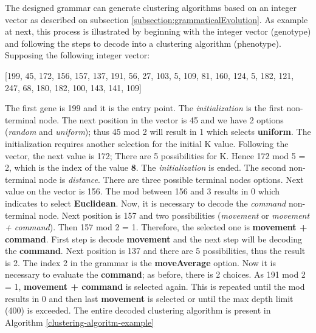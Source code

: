 \documentclass[journal]{IEEEtran}
\begin{document}
	The designed grammar can generate clustering algorithms based on an integer vector as described on subsection \ref{subsection:grammaticalEvolution}. As example at next, this process is illustrated by beginning with the integer vector (genotype) and following the steps to decode into a clustering algorithm (phenotype). 
	Supposing the following integer vector:
	
	[199, 45, 172, 156, 157, 137, 191, 56, 27, 103, 5, 109, 81, 160, 124, 5, 182, 121, 247, 68, 180, 182, 100, 143, 141, 109]
	
	The first gene is 199 and it is the entry point. The \textit{initialization} is the first non-terminal node. The next position in the vector is 45 and we have 2 options (\textit{random} and \textit{uniform}); thus 45 mod 2 will result in 1 which selects \textbf{uniform}. The initialization requires another selection for the initial K value. Following the vector, the next value is 172; There are 5 possibilities for K. Hence 172 mod 5 = 2, which is the index of the value \textbf{8}. The \textit{initialization} is ended. The second non-terminal node is \textit{distance}. There are three possible terminal nodes options. Next value on the vector is 156. The mod between 156 and 3 results in 0 which indicates to select \textbf{Euclidean}. Now, it is necessary to decode the \textit{command} non-terminal node. Next position is 157 and two possibilities (\textit{movement} or \textit{movement + command}). Then 157 mod 2 = 1. Therefore, the selected one is \textbf{movement + command}. First step is decode \textbf{movement} and the next step will be decoding the \textbf{command}. Next position is 137 and there are 5 possibilities, thus the result is 2. The index 2 in the grammar is the \textbf{moveAverage} option. Now it is necessary to evaluate the \textbf{command}; as before, there is 2 choices. As 191 mod 2 = 1, \textbf{movement + command} is selected again. This is repeated until the mod results in 0 and then last \textbf{movement} is selected or until the max depth limit (400) is exceeded. The entire decoded clustering algorithm is present in Algorithm \ref{clustering-algoritm-example}
	
\end{document}

